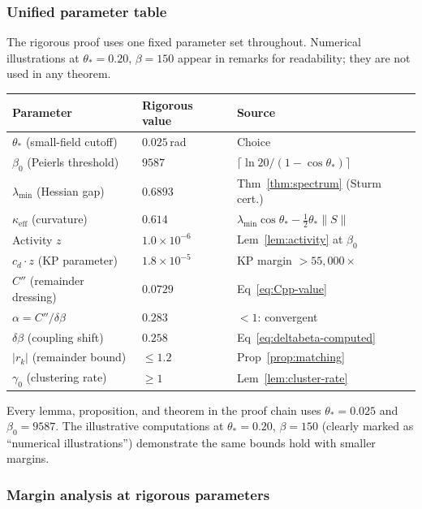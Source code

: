 \documentclass[11pt]{article}
\theoremstyle{definition}
\begin{document}
\subsubsection*{Unified parameter table}

The rigorous proof uses one fixed parameter set throughout.
Numerical illustrations at $\theta_*=0.20$, $\beta=150$ appear
in remarks for readability; they are not used in any theorem.

\begin{center}
\renewcommand{\arraystretch}{1.2}
\begin{tabular}{lll}
\toprule
\textbf{Parameter} & \textbf{Rigorous value} & \textbf{Source} \\
\midrule
$\theta_*$ (small-field cutoff) & $0.025$\,rad & Choice \\
$\beta_0$ (Peierls threshold) & $9587$ &
$\lceil\ln 20/(1-\cos\theta_*)\rceil$ \\
$\lambda_{\min}$ (Hessian gap) & $0.6893$ &
Thm~\ref{thm:spectrum} (Sturm cert.) \\
$\kappa_{\mathrm{eff}}$ (curvature) & $0.614$ &
$\lambda_{\min}\cos\theta_*-\frac{1}{2}\theta_*\|S\|$ \\
Activity $z$ & $1.0\times 10^{-6}$ &
Lem~\ref{lem:activity} at $\beta_0$ \\
$c_d\cdot z$ (KP parameter) & $1.8\times 10^{-5}$ &
KP margin $>55{,}000\times$ \\
$C''$ (remainder dressing) & $0.0729$ &
Eq~\eqref{eq:Cpp-value} \\
$\alpha=C''/\delta\beta$ & $0.283$ & $<1$: convergent \\
$\delta\beta$ (coupling shift) & $0.258$ &
Eq~\eqref{eq:deltabeta-computed} \\
$|r_k|$ (remainder bound) & $\le 1.2$ &
Prop~\ref{prop:matching} \\
$\gamma_0$ (clustering rate) & $\ge 1$ &
Lem~\ref{lem:cluster-rate} \\
\bottomrule
\end{tabular}
\end{center}

\noindent Every lemma, proposition, and theorem in the proof
chain uses $\theta_*=0.025$ and $\beta_0=9587$.
The illustrative computations at $\theta_*=0.20$, $\beta=150$
(clearly marked as ``numerical illustrations'') demonstrate
the same bounds hold with smaller margins.

\subsubsection*{Margin analysis at rigorous parameters}
\end{document}
